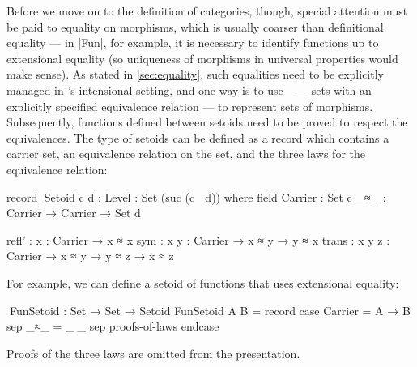 Before we move on to the definition of categories, though, special attention must be paid to equality on morphisms, which is usually coarser than definitional equality --- in |Fun|, for example, it is necessary to identify functions up to extensional equality (so uniqueness of morphisms in universal properties would make sense).
As stated in \autoref{sec:equality}, such equalities need to be explicitly managed in \Agda's intensional setting, and one way is to use ~\citep{Barthe-setoids} --- sets with an explicitly specified equivalence relation --- to represent sets of morphisms.
Subsequently, functions defined between setoids need to be proved to respect the equivalences.
The type of setoids can be defined as a record which contains a carrier set, an equivalence relation on the set, and the three laws for the equivalence relation:
\begin{code}
record ^^^Setoid {c d : Level} : Set (suc (c ⊔ d)) where
  field
    Carrier  : Set c
    _≈_      : Carrier → Carrier → Set d

    refl'  : {x : Carrier} → x ≈ x
    sym    : {x y : Carrier} → x ≈ y → y ≈ x
    trans  : {x y z : Carrier} → x ≈ y → y ≈ z → x ≈ z
\end{code}
For example, we can define a setoid of functions that uses extensional equality:
\begin{code}
^^^FunSetoid : Set → Set → Setoid
FunSetoid A B = record  case  Carrier  =  A → B
                        sep   _≈_      =  _≐_
                        sep   proofs-of-laws endcase
\end{code}
Proofs of the three laws are omitted from the presentation.

